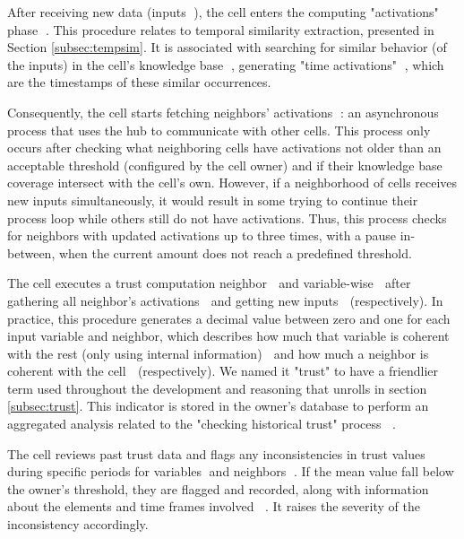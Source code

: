 After receiving new data (inputs \textcircled{}), the cell enters the computing "activations" phase \textcircled{}. This procedure relates to temporal similarity extraction, presented in Section \ref{subsec:tempsim}. It is associated with searching for similar behavior (of the inputs) in the cell's knowledge base \textcircled{}, generating "time activations" \textcircled{}, which are the timestamps of these similar occurrences.

Consequently, the cell starts fetching neighbors' activations \textcircled{}: an asynchronous process that uses the hub to communicate with other cells. This process only occurs after checking what neighboring cells have activations not older than an acceptable threshold (configured by the cell owner) and if their knowledge base coverage intersect with the cell's own. However, if a neighborhood of cells receives new inputs simultaneously, it would result in some trying to continue their process loop while others still do not have activations. Thus, this process checks for neighbors with updated activations up to three times, with a pause in-between, when the current amount does not reach a predefined threshold.

The cell executes a trust computation neighbor \textcircled{} and variable-wise \textcircled{} after gathering all neighbor's activations \textcircled{} and getting new inputs \textcircled{} (respectively). In practice, this procedure generates a decimal value between zero and one for each input variable and neighbor, which describes how much that variable is coherent with the rest (only using internal information) \textcircled{} and how much a neighbor is coherent with the cell \textcircled{} (respectively). We named it "trust" to have a friendlier term used throughout the development and reasoning that unrolls in section \ref{subsec:trust}. This indicator is stored in the owner's database to perform an aggregated analysis related to the "checking historical trust" process \textcircled{}\textcircled{}.

The cell reviews past trust data and flags any inconsistencies in trust values during specific periods for variables \textcircled{}and neighbors \textcircled{}. If the mean value fall below the owner's threshold, they are flagged and recorded, along with information about the elements and time frames involved \textcircled{}\textcircled{}. It raises the severity of the inconsistency accordingly.

